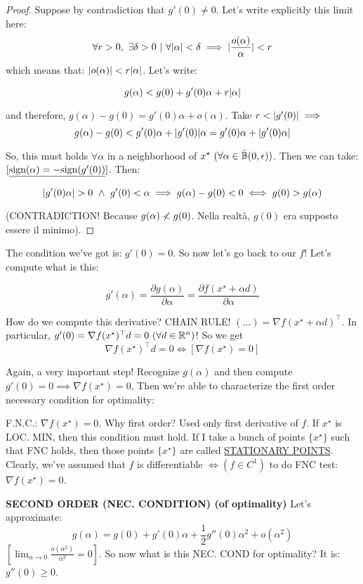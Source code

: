 \begin{proof}
Suppose by contradiction that $g'(0) \neq 0$. Let's write explicitly this limit here:
\[
	\forall r > 0,\ \exists \delta > 0\ |\ \forall \abs{\alpha} < \delta \implies \abs{\frac{o(\alpha)}{\alpha}} < r
\]
which means that: $\lvert o(\alpha)\rvert < r\lvert\alpha\rvert$. Let's write:

\[
	g(\alpha) < g(0) + g'(0)\alpha + r\lvert\alpha\rvert
\]

and therefore, $g(\alpha)-g(0) = g'(0)\alpha + o(\alpha)$. Take $r < \lvert g'(0)\rvert \implies$
\[
	g(\alpha)-g(0) < g'(0)\alpha + \lvert g'(0)\rvert{\alpha} = g'(0)\alpha + \lvert g'(0)\alpha\rvert
\]

So, this must holds $\forall \alpha$ in a neighborhood of $x^\star\ (\forall \alpha \in \bar{\mathbb{B}}(0,\epsilon))$. Then we can take: $[\underline{\text{sign}(\alpha) = -\text{sign}(g'(0))}]$. Then:

\[
	\lvert g'(0)\alpha\rvert > 0\ \land\ g'(0) < \alpha \implies g(\alpha) - g(0) < 0 \iff g(0) > g(\alpha)
\]

(CONTRADICTION! Because $g(\alpha) \centernot{<} g(0)$. Nella realtà, $g(0)$ era supposto essere il minimo).
\end{proof}

The condition we've got is: $g'(0) = 0$. So now let's go back to our $f$! Let's compute what is this:

\[
	g'(\alpha) = \frac{\partial{g(\alpha)}}{\partial{\alpha}} = \frac{\partial{f(x^\star +\alpha d)}}{\partial{\alpha}}
\]

How do we compute this derivative? CHAIN RULE! $(\dots) = \nabla{f(x^\star +\alpha d)}^\top$.
In particular, $g'(0) = \nabla{f(x^\star)^\top d} = 0\ (\forall d \in\mathbb{R}^n)$! So we get
\[
	\nabla{f(x^\star)^\top}d = 0 \iff [\nabla{f(x^\star)} = 0]
\]

Again, a very important step!
Recognize $g(\alpha)$ and then compute $g'(0)=0 \implies \nabla{f(x^\star)} = 0$, Then we're able to characterize the first order necessary condition for optimality:

F.N.C.: $\nabla{f(x^\star)} = 0$. Why first order? Used only first derivative of $f$. If $x^\star$ is LOC. MIN, then this condition must hold. If I take a bunch of points $\{x^\star\}$ such that FNC holds, then those points $\{x^\star\}$ are called \underline{STATIONARY POINTS}.
Clearly, we've assumed that $f$ is differentiable $\iff (f \in C^1)$ to do FNC test: $\nabla{f(x^\star)} = 0$.

\begin{thrm}{\textbf{SECOND ORDER (NEC. CONDITION) (of optimality)}} \newline
Let's approximate:
\[
	g(\alpha) = g(0) + g'(0)\alpha + \frac{1}{2}g''(0)\alpha^2 + o(\alpha^2)
\]
$[\lim_{\alpha\to 0}{\frac{o(\alpha^2)}{\alpha^2}} = 0]$. So now what is this NEC. COND for optimality? It is: $g''(0) \geq 0$.
\end{thrm}

